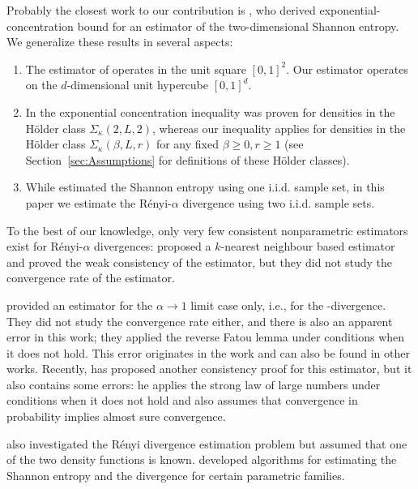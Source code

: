 Probably the closest work to our contribution is \citet{liu12exponential}, who
derived exponential-concentration bound for an estimator of the two-dimensional
Shannon entropy. We generalize these results in several aspects:
\begin{enumerate}
\item The estimator of \citet{liu12exponential} operates in the unit square $[0,1]^2$. Our
estimator operates on the $d$-dimensional unit hypercube $[0,1]^d$.
\item In \citet{liu12exponential} the exponential concentration inequality was proven for
densities in the H\"{o}lder class $\Sigma_\kappa(2,L,2)$, whereas our inequality
applies for densities in the H\"{o}lder class $\Sigma_\kappa(\beta,L,r)$ for
any fixed $\beta \geq 0, r \geq 1$ (see Section~\ref{sec:Assumptions} for definitions of these
H\"older classes).
\item While \citet{liu12exponential} estimated the Shannon entropy using one i.i.d. sample set, in this paper
we estimate the R\'enyi-$\alpha$ divergence using two i.i.d. sample sets.
\end{enumerate}

To the best of our knowledge, only very few consistent nonparametric
estimators exist for R\'enyi-$\alpha$ divergences: \citet{poczos11AISTATS}
proposed a $k$-nearest neighbour based estimator and proved the weak
consistency of the estimator, but they did not study the convergence rate of
the estimator.

\citet{Wang-Kulkarni-Verdu2009} provided an estimator for
the $\alpha \to 1$ limit case only, i.e., for the
-divergence. They did not study the convergence rate either, and
there is also an apparent error in this work; they applied the reverse Fatou
lemma under conditions when it does not hold. This error originates in the work
 \citet{kozachenko87statistical} and can also be found in other works.
Recently, \citet{perez08estimation} has proposed another consistency proof for
this estimator, but it also contains some errors: he applies the strong law of
large numbers under conditions when it does not hold and also assumes that
convergence in probability implies almost sure convergence.

\citet{hero02alpha,hero2002aes} also investigated the
R\'enyi divergence estimation problem but assumed that one of the two
density functions is known. \citet{gupta12parametric} developed
algorithms for estimating the Shannon entropy and the 
divergence for certain parametric
families.

